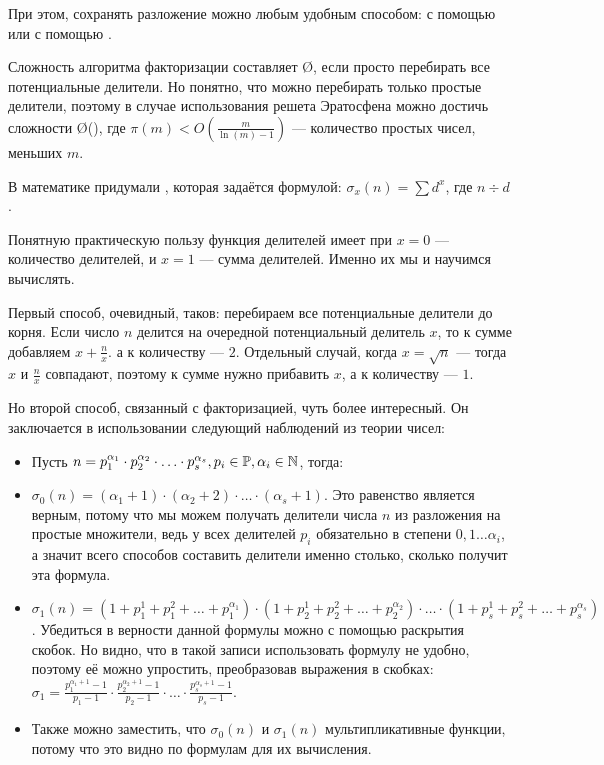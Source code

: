 При этом, сохранять разложение можно любым удобным способом: с помощью  или с помощью .

Сложность алгоритма факторизации составляет \O{}, если просто перебирать все потенциальные делители. Но понятно, что можно перебирать только простые делители, поэтому в случае использования решета Эратосфена можно достичь сложности \O{\pi()}, где $\pi(m) < O\left(\frac{m}{\ln(m) - 1}\right)$ — количество простых чисел, меньших $m$.


В математике придумали , которая задаётся формулой: $\sigma_x(n) = \sum d^x$, где $n \div d$.

Понятную практическую пользу функция делителей имеет при $x = 0$ — количество делителей, и $x = 1$ — сумма делителей. Именно их мы и научимся вычислять.

Первый способ, очевидный, таков: перебираем все потенциальные делители до корня. Если число $n$ делится на очередной потенциальный делитель $x$, то к сумме добавляем $x + \frac{n}{x}$. а к количеству — $2$. Отдельный случай, когда $x = \sqrt{n}$ — тогда $x$ и $\frac{n}{x}$ совпадают, поэтому к сумме нужно прибавить $x$, а к количеству — $1$.

Но второй способ, связанный с факторизацией, чуть более интересный. Он заключается в использовании следующий наблюдений из теории чисел:

\begin{itemize}
    \item Пусть $n = p_1^{\alpha_1} \cdot p_2^{\alpha_2} \cdot \ldots \cdot p_s^{\alpha_s}, p_i \in \mathbb{P}, \alpha_i \in \mathbb{N}$, тогда:
    \item $\sigma_0(n) = (\alpha_1 + 1) \cdot (\alpha_2 + 2) \cdot \ldots \cdot (\alpha_s + 1)$. Это равенство является верным, потому что мы можем получать делители числа $n$ из разложения на простые множители, ведь у всех делителей $p_i$ обязательно в степени $0, 1 \ldots \alpha_i$, а значит всего способов составить делители именно столько, сколько получит эта формула.
    \item $\sigma_1(n) = (1 + p_1^1 + p_1^2 + \ldots + p_1^{\alpha_1}) \cdot (1 + p_2^1 + p_2^2 + \ldots + p_2^{\alpha_2}) \cdot \ldots \cdot (1 + p_s^1 + p_s^2 + \ldots + p_s^{\alpha_s})$. Убедиться в верности данной формулы можно с помощью раскрытия скобок. Но видно, что в такой записи использовать формулу не удобно, поэтому её можно упростить, преобразовав выражения в скобках: $\sigma_1 = \frac{p_1^{\alpha_1 + 1} - 1}{p_1 - 1} \cdot \frac{p_2^{\alpha_2 + 1} - 1}{p_2 - 1} \cdot \ldots \cdot \frac{p_s^{\alpha_s + 1} - 1}{p_s - 1}$.
    \item Также можно заместить, что $\sigma_0(n)$ и $\sigma_1(n)$ мультипликативные функции, потому что это видно по формулам для их вычисления.
\end{itemize}

